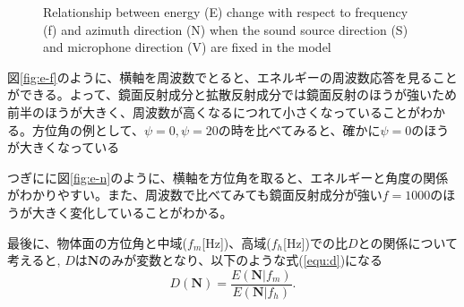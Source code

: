 \begin{figure}[t]
  \centering
  \label{fig:e-f}
  \centering
  \label{fig:e-n}
 \caption{Relationship between energy (E) change with respect to frequency (f) and azimuth direction (N) when the sound source direction (S) and microphone direction (V) are fixed in the model}\label{fig:e_f&N}
\end{figure}

図\ref{fig:e-f}のように、横軸を周波数でとると、エネルギーの周波数応答を見ることができる。よって、鏡面反射成分と拡散反射成分では鏡面反射のほうが強いため前半のほうが大きく、周波数が高くなるにつれて小さくなっていることがわかる。方位角の例として、$\psi=0, \psi=20$の時を比べてみると、確かに$\psi=0$のほうが大きくなっている

つぎにに図\ref{fig:e-n}のように、横軸を方位角を取ると、エネルギーと角度の関係がわかりやすい。また、周波数で比べてみても鏡面反射成分が強い$f=1000$のほうが大きく変化していることがわかる。

最後に、物体面の方位角と中域($f_m$[Hz])、高域($f_h$[Hz])での比$D$との関係について考えると, $D$は$\mathbf{N}$のみが変数となり、以下のような式(\ref{equ:d})になる
\begin{equation}
	\label{equ:d}
	D(\mathbf{N}) = \frac{E(\mathbf{N}|f_{m})}{E(\mathbf{N}|f_{h})}.
\end{equation}

